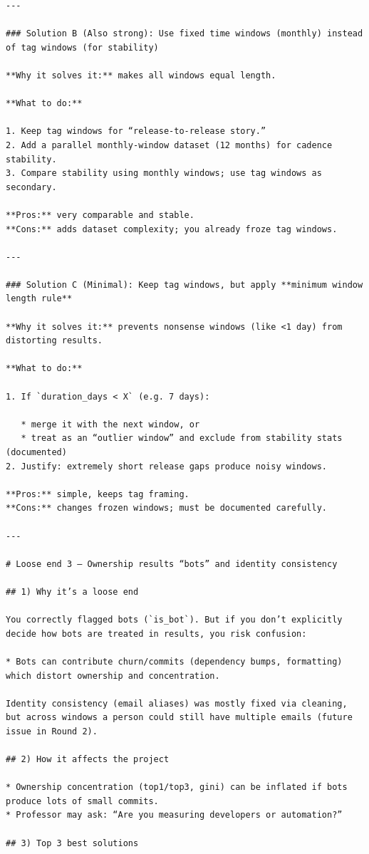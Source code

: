 \documentclass[11pt,a4paper]{article}
\begin{document}
\begin{verbatim}
---

### Solution B (Also strong): Use fixed time windows (monthly) instead of tag windows (for stability)

**Why it solves it:** makes all windows equal length.

**What to do:**

1. Keep tag windows for “release-to-release story.”
2. Add a parallel monthly-window dataset (12 months) for cadence stability.
3. Compare stability using monthly windows; use tag windows as secondary.

**Pros:** very comparable and stable.
**Cons:** adds dataset complexity; you already froze tag windows.

---

### Solution C (Minimal): Keep tag windows, but apply **minimum window length rule**

**Why it solves it:** prevents nonsense windows (like <1 day) from distorting results.

**What to do:**

1. If `duration_days < X` (e.g. 7 days):

   * merge it with the next window, or
   * treat as an “outlier window” and exclude from stability stats (documented)
2. Justify: extremely short release gaps produce noisy windows.

**Pros:** simple, keeps tag framing.
**Cons:** changes frozen windows; must be documented carefully.

---

# Loose end 3 — Ownership results “bots” and identity consistency

## 1) Why it’s a loose end

You correctly flagged bots (`is_bot`). But if you don’t explicitly decide how bots are treated in results, you risk confusion:

* Bots can contribute churn/commits (dependency bumps, formatting) which distort ownership and concentration.

Identity consistency (email aliases) was mostly fixed via cleaning, but across windows a person could still have multiple emails (future issue in Round 2).

## 2) How it affects the project

* Ownership concentration (top1/top3, gini) can be inflated if bots produce lots of small commits.
* Professor may ask: “Are you measuring developers or automation?”

## 3) Top 3 best solutions


\end{verbatim}
\end{document}
